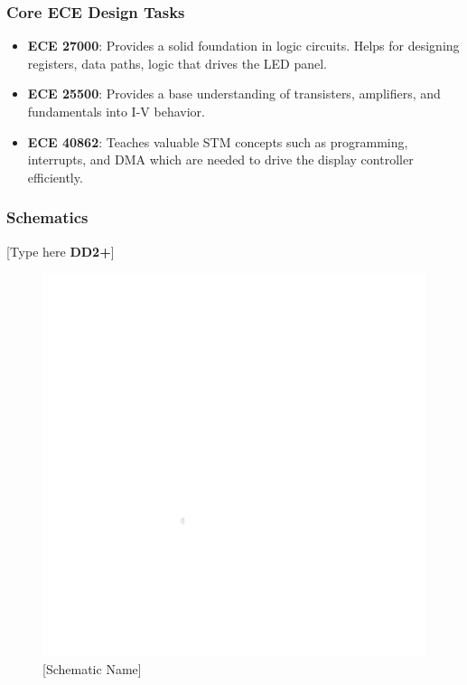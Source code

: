 \subsubsection{Core ECE Design Tasks}
\begin{itemize}
    \item \textbf{ECE 27000}: Provides a solid foundation in logic circuits. Helps for designing registers, data paths, logic that drives the LED panel.
    \item \textbf{ECE 25500}: Provides a base understanding of transisters, amplifiers, and fundamentals into I-V behavior.
    \item \textbf{ECE 40862}: Teaches valuable STM concepts such as programming, interrupts, and DMA which are needed to drive the display controller efficiently.
\end{itemize}

\subsubsection{Schematics}
[Type here \textbf{DD2+}]
\begin{figure}[h]
    \centering
    \includegraphics[width=16cm]{images/white.png} %
    \caption{[Schematic Name]}
\end{figure} %

